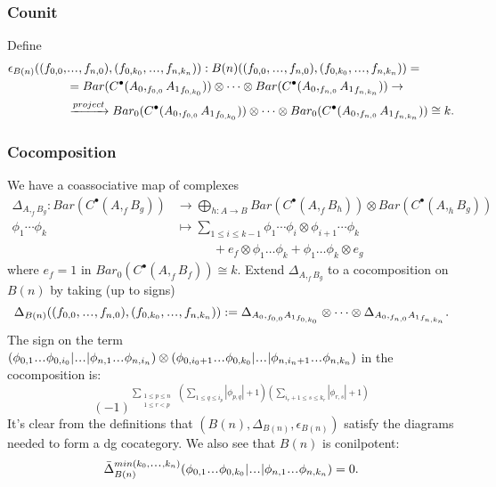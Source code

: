 \subsubsection{Counit}
Define
\begin{align*}
\epsilon_{B(n)}((f_{0,0},&\smdots,f_{n,0}), 
  (f_{0,k_0},\smdots,f_{n,k_n})):
B(n)((f_{0,0},\smdots,f_{n,0}), 
  (f_{0,k_0},\smdots,f_{n,k_n})) =\\
&=
Bar(C^\bullet(A_0, _{f_{0,0}}{A_1}_{f_{0,k_0}})) 
  \otimes \cdots \otimes 
  Bar(C^\bullet(A_0, _{f_{n,0}}{A_1}_{f_{n,k_n}}))
  \to \\
&\xrightarrow{project}
  Bar_0(C^\bullet(A_0, _{f_{0,0}}{A_1}_{f_{0,k_0}})) 
  \otimes \cdots \otimes 
  Bar_0(C^\bullet(A_0, _{f_{n,0}}{A_1}_{f_{n,k_n}}))
\cong k.
\end{align*}
%
\subsubsection{Cocomposition}
We have a coassociative map of complexes
%
\begin{align*}
\Delta_{A, _fB_g}: Bar(C^\bullet(A, _fB_g)) 
&\to \bigoplus\limits_{h: A \to B} Bar(C^\bullet(A, _fB_h)) \otimes Bar(C^\bullet(A, _hB_g)) \\
\phi_1 \cdots \phi_k 
&\mapsto \sum\limits_{1\leq i \leq k-1} 
\phi_1 \cdots \phi_i \otimes 
  \phi_{i+1} \cdots \phi_k\\
&\phantom{{}\mapsto \sum{}}
  + e_f\otimes \phi_1 \dots \phi_k + 
  \phi_1 \dots \phi_k \otimes e_g  
\end{align*}
%
where 
$e_f = 1$ in $Bar_0(C^\bullet(A, _fB_f)) \cong k$.
Extend $\Delta_{A, _fB_g}$ to a 
cocomposition on $B(n)$ by taking 
(up to signs)
$$
\Delta_{B(n)}((f_{0,0},\smdots,f_{n,0}), 
  (f_{0,k_0},\smdots,f_{n,k_n})) :=
\Delta_{A_0, _{f_{0,0}}{A_1}_{f_{0,k_0}}} 
\otimes \dots \otimes
\Delta_{A_0, _{f_{n,0}}{A_1}_{f_{n,k_n}}}.
$$
The sign on the term
$
(\phi_{0,1}\smdots \phi_{0,i_0} | \smdots |
\phi_{n,1}\smdots \phi_{n,i_n}) \otimes
(\phi_{0,i_0+1}\smdots \phi_{0,k_0} | \smdots |
\phi_{n,i_n+1}\smdots \phi_{n,k_n}) 
$
in the cocomposition is:
$$
(-1)^{\sum \limits_{\substack{
  1 \leq p \leq n\\ 1 \leq r<p}}\;
(\sum \limits_{1\leq q \leq i_p} |\phi_{p,q}|+1)
(\sum \limits_{i_r+1 \leq s \leq k_r} |\phi_{r,s}|+1)}
$$
%
It's clear from the definitions that
$(B(n), \Delta_{B(n)}, \epsilon_{B(n)})$ 
satisfy the diagrams needed to form a dg cocategory. 
We also see that $B(n)$ is conilpotent: 
$$
\bar{\Delta}_{B(n)}^{min(k_0,\smdots,k_n)}
(\phi_{0,1}\smdots\phi_{0,k_0}|\smdots|
\phi_{n,1}\smdots\phi_{n,k_n}) = 0.
$$